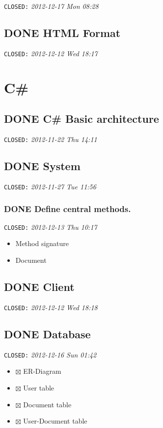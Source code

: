 \documentclass[11pt]{article}
\begin{document}
   \texttt{CLOSED:} \textit{2012-12-17 Mon 08:28}
\subsection{\textbf{DONE} HTML Format}
\label{sec-1-17}

   \texttt{CLOSED:} \textit{2012-12-12 Wed 18:17}
\section{C\#}
\label{sec-2}
\subsection{\textbf{DONE} C\# Basic architecture}
\label{sec-2-1}

   \texttt{CLOSED:} \textit{2012-11-22 Thu 14:11}
\subsection{\textbf{DONE} System}
\label{sec-2-2}

   \texttt{CLOSED:} \textit{2012-11-27 Tue 11:56}
\subsubsection{\textbf{DONE} Define central methods.}
\label{sec-2-2-1}

    \texttt{CLOSED:} \textit{2012-12-13 Thu 10:17}

\begin{itemize}
\item Method signature
\item Document
\end{itemize}
\subsection{\textbf{DONE} Client}
\label{sec-2-3}

   \texttt{CLOSED:} \textit{2012-12-12 Wed 18:18}
\subsection{\textbf{DONE} Database}
\label{sec-2-4}

   \texttt{CLOSED:} \textit{2012-12-16 Sun 01:42}

\begin{itemize}
\item $\boxtimes$ ER-Diagram
\item $\boxtimes$ User table
\item $\boxtimes$ Document table
\item $\boxtimes$ User-Document table
\end{itemize}
\end{document}
